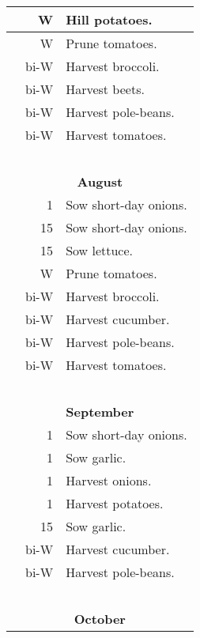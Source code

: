 \documentclass{article}
\begin{document}
\begin{longtable}{r|r|l}
	& W & Hill potatoes. \\ \hline
	& W & Prune tomatoes. \\ \hline
	& bi-W & Harvest broccoli. \\ \hline
	& bi-W & Harvest beets. \\ \hline
	& bi-W & Harvest pole-beans. \\ \hline
	& bi-W & Harvest tomatoes. \\ \hline
	& & \\ \hline
	& & \\ \hline
	& & \\ \hline
	& & \\ \hline
	& & \\ \hline
	\multicolumn{3}{c}{\textbf{August}} \\ \hline
	& 1 & Sow short-day onions. \\ \hline
	& 15 & Sow short-day onions. \\ \hline
	& 15 & Sow lettuce. \\ \hline
	& W & Prune tomatoes. \\ \hline
	& bi-W & Harvest broccoli. \\ \hline
	& bi-W & Harvest cucumber. \\ \hline
	& bi-W & Harvest pole-beans. \\ \hline
	& bi-W & Harvest tomatoes. \\ \hline
	& & \\ \hline
	& & \\ \hline
	& & \\ \hline
	& & \\ \hline
	& & \\ \hline
	\multicolumn{3}{c}{\textbf{September}} \\ \hline
	& 1 & Sow short-day onions. \\ \hline
	& 1 & Sow garlic. \\ \hline
	& 1 & Harvest onions. \\ \hline
	& 1 & Harvest potatoes. \\ \hline
	& 15 & Sow garlic. \\ \hline
	& bi-W & Harvest cucumber. \\ \hline
	& bi-W & Harvest pole-beans. \\ \hline
	& & \\ \hline
	& & \\ \hline
	& & \\ \hline
	& & \\ \hline
	& & \\ \hline
	\multicolumn{3}{c}{\textbf{October}} \\ \hline

\end{longtable}
\end{document}
